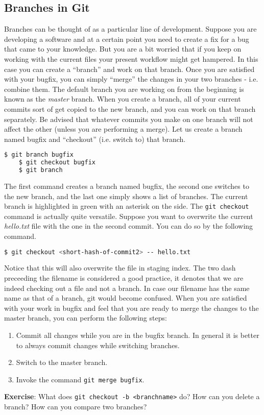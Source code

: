 \documentclass{article}
\begin{document}
\subsection{Branches in Git}
Branches can be thought of as a particular line of development.
Suppose you are developing a software and at a certain point you need to create a fix for a bug that came to your knowledge.
But you are a bit worried that if you keep on working with the current files your present workflow might get hampered.
In this case you can create a ``branch'' and work on that branch.
Once you are satisfied with your bugfix, you can simply ``merge'' the changes in your two branches - i.e. combine them.
The default branch you are working on from the beginning is known as the \textit{master} branch.
When you create a branch, all of your current commits sort of get copied to the new branch, and you can work on that branch separately.
Be advised that whatever commits you make on one branch will not affect the other (unless you are performing a merge).
Let us create a branch named bugfix and ``checkout'' (i.e. switch to) that branch.
\begin{lstlisting}[language=bash]
	$ git branch bugfix
	$ git checkout bugfix
	$ git branch
\end{lstlisting}
The first command creates a branch named bugfix, the second one switches to the new branch,
and the last one simply shows a list of branches.
The current branch is highlighted in green with an asterisk on the side. The \verb|git checkout| command is actually quite versatile.
Suppose you want to overwrite the current \textit{hello.txt} file with the one in the second commit.
You can do so by the following command.
\begin{lstlisting}[language=bash]
	$ git checkout <short-hash-of-commit2> -- hello.txt
\end{lstlisting}
Notice that this will also overwrite the file in staging index.
The two dash preceeding the filename is considered a good practice, it denotes that we are indeed checking out a file and not a branch.
In case our filename has the same name as that of a branch, git would become confused.
When you are satisfied with your work in bugfix and feel that you are ready to merge the changes to the master branch,
you can perform the following steps:
\begin{enumerate}
	\item Commit all changes while you are in the bugfix branch. 
		In general it is better to always commit changes while switching branches.
	\item Switch to the master branch.
	\item Invoke the command \verb|git merge bugfix|.
\end{enumerate}
\textbf{Exercise}: What does \verb|git checkout -b <branchname>| do? How can you delete a branch?
How can you compare two branches?
\end{document}
